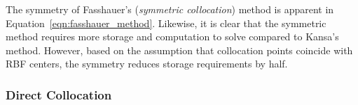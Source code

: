 \documentclass[11pt]{report}
\begin{document}
{The symmetry of Fasshauer's (\emph{symmetric collocation}) method is apparent in Equation~\ref{eqn:fasshauer_method}. Likewise, it is clear that the symmetric method requires more storage and computation to solve compared to Kansa's method. However, based on the assumption that collocation points coincide with RBF centers, the symmetry reduces storage requirements by half. 
 
 
\subsubsection{Direct Collocation}

}
\end{document}
